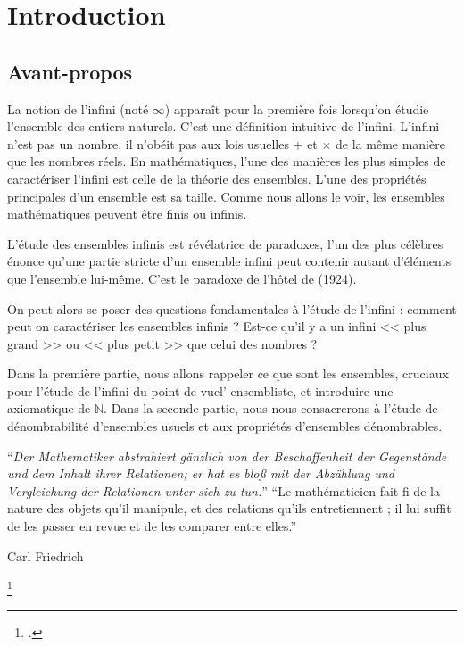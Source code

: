 \documentclass[a4paper,french,final]{memoir}
\begin{document}
\begin{titlingpage}

\end{titlingpage}
\frontmatter
\tableofcontents
\part{Introduction}

\chapter{Avant-propos}

La notion de l'infini (noté $\infty$) apparaît pour la première fois lorsqu'on étudie l'ensemble des entiers naturels. C'est une définition intuitive de l'infini. L'infini n'est pas un nombre, il n'obéit pas aux lois usuelles $+$ et $\times$ de la même manière que les nombres réels. En mathématiques, l'une des manières les plus simples de caractériser l'infini est celle de la théorie des ensembles. L'une des propriétés principales d'un ensemble est sa taille. Comme nous allons le voir, les ensembles mathématiques peuvent être finis ou infinis.

L'étude des ensembles infinis est révélatrice de paradoxes, l'un des plus célèbres  énonce qu'une partie stricte d'un ensemble infini peut contenir autant d'éléments que l'ensemble lui-même. C'est le paradoxe de l'hôtel de  (1924).

On peut alors se poser des questions fondamentales à l'étude de l'infini : comment peut on caractériser les ensembles infinis ? Est-ce qu'il y a un infini << plus grand >> ou << plus petit >> que celui des nombres ?  

Dans la première partie, nous allons rappeler ce que sont les ensembles, cruciaux pour l'étude de l'infini du point de vuel' ensembliste, et introduire une axiomatique de $\mathbb{N}$. Dans la seconde partie, nous nous consacrerons à l'étude de dénombrabilité d'ensembles usuels et aux propriétés d'ensembles dénombrables.\\

\epigraph{%
	\enquote{\itshape Der Mathematiker abstrahiert gänzlich von der Beschaffenheit der Gegenstände und dem Inhalt ihrer Relationen; er hat es bloß mit der Abzählung und Vergleichung der Relationen unter sich zu tun.}\newline \newline
\enquote{Le mathématicien fait fi de la nature des objets qu'il manipule, et des relations qu'ils entretiennent ; il lui suffit de les passer en revue et de les comparer entre elles.}
}{Carl Friedrich \footnotemark}\footcitetext{gauss_cite}
\end{document}
